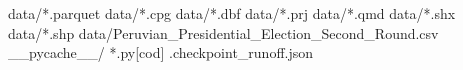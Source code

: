data/*.parquet
data/*.cpg
data/*.dbf
data/*.prj
data/*.qmd
data/*.shx
data/*.shp
data/Peruvian_Presidential_Election_Second_Round.csv
__pycache__/
*.py[cod]
.checkpoint_runoff.json